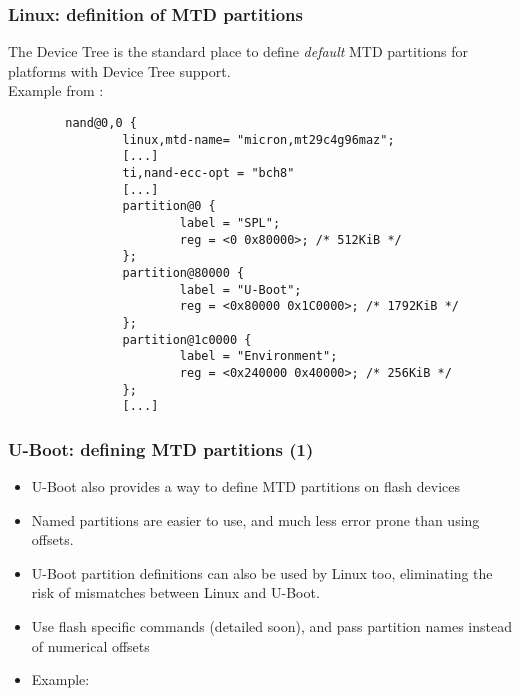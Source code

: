 \begin{frame}[fragile]
  \frametitle{Linux: definition of MTD partitions}
  \small
  The Device Tree is the standard place to define {\em default} MTD partitions
  for platforms with Device Tree support.\\
  Example from :
\begin{verbatim}
        nand@0,0 {
                linux,mtd-name= "micron,mt29c4g96maz";
                [...]
                ti,nand-ecc-opt = "bch8"
                [...]
                partition@0 {
                        label = "SPL";
                        reg = <0 0x80000>; /* 512KiB */
                };
                partition@80000 {
                        label = "U-Boot";
                        reg = <0x80000 0x1C0000>; /* 1792KiB */
                };
                partition@1c0000 {
                        label = "Environment";
                        reg = <0x240000 0x40000>; /* 256KiB */
                };
                [...]
\end{verbatim}
\end{frame}

\begin{frame}
  \frametitle{U-Boot: defining MTD partitions (1)}
  \begin{itemize}
  \item U-Boot also provides a way to define MTD partitions on flash devices
  \item Named partitions are easier to use, and much less error prone than using offsets.
  \item U-Boot partition definitions can also be used by Linux too,
    eliminating the risk of mismatches between Linux and U-Boot. 
  \item Use flash specific commands (detailed soon),
    and pass partition names instead of numerical offsets
  \item Example: 
  \end{itemize}
\end{frame}

